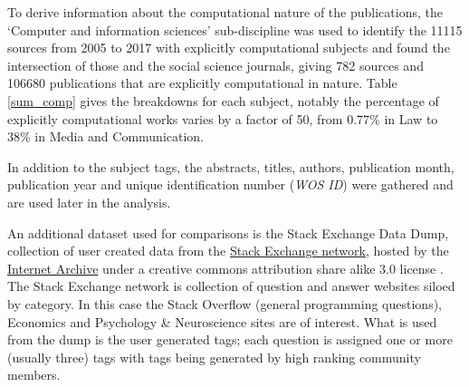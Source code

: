 \documentclass[12pt, a4paper]{article}
\begin{document}
To derive information about the computational nature of the publications, the `Computer and information sciences' sub-discipline was used to identify the \num{11115} sources from 2005 to 2017 with explicitly computational subjects and found the intersection of those and the social science journals, giving \num{782} sources and \num{106680} publications that are explicitly computational in nature. Table \ref{sum_comp} gives the breakdowns for each subject, notably the percentage of explicitly computational works varies by a factor of \num{50}, from \num{0.77}\% in Law to \num{38}\% in Media and Communication. 

In addition to the subject tags, the abstracts, titles, authors, publication month, publication year and unique identification number (\textit{WOS ID}) were gathered and are used later in the analysis.

An additional dataset used for comparisons is the Stack Exchange Data Dump, collection of user created data from the \href{http://stackexchange.com/}{Stack Exchange network}, hosted by the \href{https://archive.org/details/stackexchange}{Internet Archive} under a creative commons attribution share alike 3.0 license \citep{StackExchange}. The Stack Exchange network is collection of question and answer websites siloed by category. In this case the Stack Overflow (general programming questions), Economics and Psychology \& Neuroscience sites are of interest. What is used from the dump is the user generated tags; each question is assigned one or more (usually three) tags with tags being generated by high ranking community members.
\end{document}
